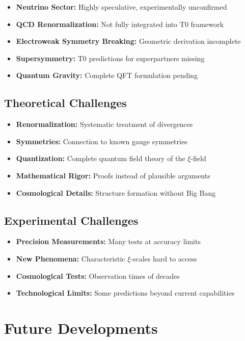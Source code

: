 \documentclass[12pt,a4paper]{article}
\begin{document}
	\begin{itemize}
		\item \textbf{Neutrino Sector:} Highly speculative, experimentally unconfirmed
		\item \textbf{QCD Renormalization:} Not fully integrated into T0 framework
		\item \textbf{Electroweak Symmetry Breaking:} Geometric derivation incomplete
		\item \textbf{Supersymmetry:} T0 predictions for superpartners missing
		\item \textbf{Quantum Gravity:} Complete QFT formulation pending
	\end{itemize}
	
	\subsection{Theoretical Challenges}
	
	\begin{itemize}
		\item \textbf{Renormalization:} Systematic treatment of divergences
		\item \textbf{Symmetries:} Connection to known gauge symmetries
		\item \textbf{Quantization:} Complete quantum field theory of the $\xi$-field
		\item \textbf{Mathematical Rigor:} Proofs instead of plausible arguments
		\item \textbf{Cosmological Details:} Structure formation without Big Bang
	\end{itemize}
	
	\subsection{Experimental Challenges}
	
	\begin{itemize}
		\item \textbf{Precision Measurements:} Many tests at accuracy limits
		\item \textbf{New Phenomena:} Characteristic $\xi$-scales hard to access
		\item \textbf{Cosmological Tests:} Observation times of decades
		\item \textbf{Technological Limits:} Some predictions beyond current capabilities
	\end{itemize}
	
	\section{Future Developments}
	
\end{document}
